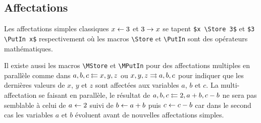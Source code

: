 \documentclass[12pt,a4paper]{article}
\begin{document}

\subsection{Affectations}

Les affectations simples classiques $x \leftarrow 3$ et $3 \rightarrow x$ se tapent \verb+$x \Store 3$+ et \verb+$3 \PutIn x$+ respectivement où les macros \verb+\Store+ et \verb+\PutIn+ sont des opérateurs mathématiques.

\medskip

Il existe aussi les macros \verb+\MStore+ et \verb+\MPutIn+ pour des affectations multiples en parallèle comme dans $a, b, c \leftleftarrows x, y, z$ ou $x, y, z \rightrightarrows a, b, c$ pour indiquer que les dernières valeurs de $x$, $y$ et $z$ sont affectées aux variables $a$, $b$ et $c$.
La multi-affectation se faisant en parallèle, le résultat de $a, b, c \leftleftarrows 2, a + b, c - b$ ne sera pas semblable à celui de $a \leftarrow 2$ suivi de $b \leftarrow a + b$ puis $c \leftarrow c - b$ car dans le second cas les variables $a$ et $b$ évoluent avant de nouvelles affectations simples.
\end{document}
